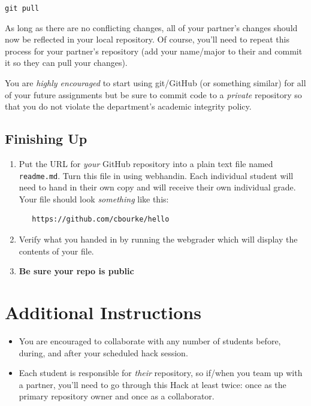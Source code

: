 \documentclass[12pt]{scrartcl}
\begin{document}
\texttt{git pull}

As long as there are no conflicting changes, all of your partner's
changes should now be reflected in your local repository.  Of course,
you'll need to repeat this process for your partner's repository (add
your name/major to their and commit it so they can pull your changes).  

You are \emph{highly encouraged} to start using git/GitHub (or 
something similar) for all of your future assignments 
but be sure to commit code to a \emph{private} repository 
so that you do not violate the department's academic integrity 
policy.  

\subsection{Finishing Up}

\begin{enumerate}
  \item Put the URL for \emph{your} GitHub repository into a plain text file named 
  \texttt{readme.md}.  Turn this file
  in using webhandin.  Each individual student will need
  to hand in their own copy and will receive their own individual
  grade.  Your file should look \emph{something} like this:
  \begin{verbatim}
   https://github.com/cbourke/hello
  \end{verbatim}
  \item Verify what you handed in by running the webgrader which will
  display the contents of your file.
  \item \textbf{Be sure your repo is public}
\end{enumerate}

\section*{Additional Instructions}

\begin{itemize}
  \item You are encouraged to collaborate with any number of students 
  before, during, and after your scheduled hack session.    
  \item Each student is responsible for \emph{their} repository, so 
  if/when you team up with a partner, you'll need to go through this
  Hack at least twice: once as the primary repository owner and once as
  a collaborator.
\end{itemize}
  
\end{document}
